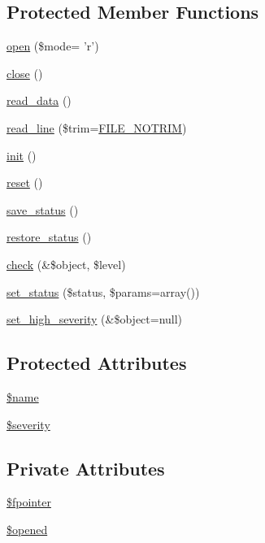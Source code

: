 \subsection*{Protected Member Functions}
\begin{DoxyCompactItemize}
\item 
\hyperlink{classFileHandler_a2a650b033c4eb1f98ba47fb05ce7b454}{open} (\$mode= 'r')
\item 
\hyperlink{classFileHandler_aa48e7c3b67346e29b194d2f0ac5dd1f8}{close} ()
\item 
\hyperlink{classFileHandler_a1389a6ea19a22471c301d70b5ed68ed8}{read\_\-data} ()
\item 
\hyperlink{classFileHandler_a69f84a8138f717c84f560125f1f95448}{read\_\-line} (\$trim=\hyperlink{class_8filehandler_8php_a3720f2e15eb9e16e29d8ecbb96763662}{FILE\_\-NOTRIM})
\item 
\hyperlink{class__OWL_ae0ef3ded56e8a6b34b6461e5a721cd3e}{init} ()
\item 
\hyperlink{class__OWL_a2f2a042bcf31965194c03033df0edc9b}{reset} ()
\item 
\hyperlink{class__OWL_a9e49b9c76fbc021b244c6915ea536d71}{save\_\-status} ()
\item 
\hyperlink{class__OWL_a465eeaf40edd9f9c848841700c32ce55}{restore\_\-status} ()
\item 
\hyperlink{class__OWL_ad6f4f6946f40199dd0333cf219fa500e}{check} (\&\$object, \$level)
\item 
\hyperlink{class__OWL_aea912d0ede9b3c2a69b79072d94d4787}{set\_\-status} (\$status, \$params=array())
\item 
\hyperlink{class__OWL_a576829692a3b66e3d518853bf43abae3}{set\_\-high\_\-severity} (\&\$object=null)
\end{DoxyCompactItemize}
\subsection*{Protected Attributes}
\begin{DoxyCompactItemize}
\item 
\hyperlink{classFileHandler_a94903bd51b241928ed415ad271c38805}{\$name}
\item 
\hyperlink{class__OWL_ad26b40a9dbbacb33e299b17826f8327c}{\$severity}
\end{DoxyCompactItemize}
\subsection*{Private Attributes}
\begin{DoxyCompactItemize}
\item 
\hyperlink{classFileHandler_aa0aa66fd3ad551b3f508b901a95c0c2d}{\$fpointer}
\item 
\hyperlink{classFileHandler_a061409b2bbd2e13bc47415527c0de720}{\$opened}
\end{DoxyCompactItemize}


